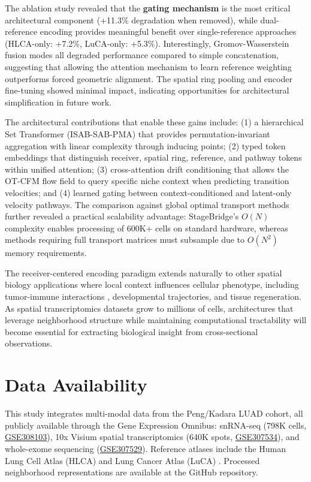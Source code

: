\documentclass[conference]{IEEEtran}
\begin{document}
The ablation study revealed that the \textbf{gating mechanism} is the most critical architectural component (+11.3\% degradation when removed), while dual-reference encoding provides meaningful benefit over single-reference approaches (HLCA-only: +7.2\%, LuCA-only: +5.3\%). Interestingly, Gromov-Wasserstein fusion modes all degraded performance compared to simple concatenation, suggesting that allowing the attention mechanism to learn reference weighting outperforms forced geometric alignment. The spatial ring pooling and encoder fine-tuning showed minimal impact, indicating opportunities for architectural simplification in future work.

The architectural contributions that enable these gains include: (1) a hierarchical Set Transformer (ISAB-SAB-PMA) that provides permutation-invariant aggregation with linear complexity through inducing points; (2) typed token embeddings that distinguish receiver, spatial ring, reference, and pathway tokens within unified attention; (3) cross-attention drift conditioning that allows the OT-CFM flow field to query specific niche context when predicting transition velocities; and (4) learned gating between context-conditioned and latent-only velocity pathways. The comparison against global optimal transport methods further revealed a practical scalability advantage: StageBridge's $O(N)$ complexity enables processing of 600K+ cells on standard hardware, whereas methods requiring full transport matrices must subsample due to $O(N^2)$ memory requirements.

The receiver-centered encoding paradigm extends naturally to other spatial biology applications where local context influences cellular phenotype, including tumor-immune interactions \cite{Hoebel2026-tq, Dimitrov2024-fb}, developmental trajectories, and tissue regeneration. As spatial transcriptomics datasets grow to millions of cells, architectures that leverage neighborhood structure while maintaining computational tractability will become essential for extracting biological insight from cross-sectional observations.

\section{Data Availability}

This study integrates multi-modal data from the Peng/Kadara LUAD cohort, all publicly available through the Gene Expression Omnibus: snRNA-seq (798K cells, \href{https://www.ncbi.nlm.nih.gov/geo/query/acc.cgi?acc=GSE308103}{GSE308103}), 10x Visium spatial transcriptomics (640K spots, \href{https://www.ncbi.nlm.nih.gov/geo/query/acc.cgi?acc=GSE307534}{GSE307534}), and whole-exome sequencing (\href{https://www.ncbi.nlm.nih.gov/geo/query/acc.cgi?acc=GSE307529}{GSE307529}). Reference atlases include the Human Lung Cell Atlas (HLCA) \cite{Sikkema2023-dr} and Lung Cancer Atlas (LuCA) \cite{Salcher2022-pu}. Processed neighborhood representations are available at the GitHub repository.
\end{document}
